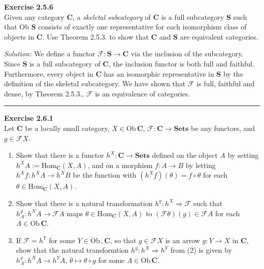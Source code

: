 \documentclass[a4paper, 11pt]{article}
\newenvironment{problem}[2][Exercise]
    { \begin{mdframed}[backgroundcolor=gray!20] \textbf{#1 #2} \\}
    {  \end{mdframed}}
\newenvironment{solution}
    {\textit{Solution:}}
    {}
\begin{document}
\begin{problem}{2.5.6}
Given any category \(\mathbf{C}\), a \textit{skeletal subcategory} of \(\mathbf{C}\) is a full subcategory \(\mathbf{S}\) such that Ob \(\mathbf{S}\) consists of 
exactly one representative for each isomorphism class of objects in \(\mathbf{C}\). Use Theorem 2.5.3. to show that \(\mathbf{C}\) and \(\mathbf{S}\) are equivalent categories.
\end{problem}
\begin{solution}
We define a functor \(\mathcal{F}:\mathbf{S}\rightarrow \mathbf{C}\) via the inclusion of the subcategory. Since \(\mathbf{S}\) is a full subcategory of \(\mathbf{C}\), the inclusion functor 
is both full and faithful. Furthermore, every object in \(\mathbf{C}\) has an isomorphic representative in \(\mathbf{S}\) by the definition of the skeletal subcategory. We have shown that 
\(\mathcal{F}\) is full, faithful and dense, by Theorem 2.5.3., \(\mathcal{F}\) is an equivalence of categories.
\end{solution}
\\ 
\noindent\rule{7in}{2.8pt}
\begin{problem}{2.6.1}
Let \(\mathbf{C}\) be a locally small category, \(X\in \text{Ob}\, \mathbf{C}\), \(\mathcal{F}:\mathbf{C}\rightarrow \textbf{Sets}\) be any functors, and \(g\in \mathcal{F}X\).
\begin{enumerate}
    \item Show that there is a functor \(h^X:\mathbf{C}\rightarrow \textbf{Sets}\) defined on the object \(A\) by setting \(h^X A:=\text{Hom}_{\mathbf{C}}(X,A)\), and on a morphism 
          \(f:A\rightarrow B\) by letting \(h^X f:h^X A\rightarrow h^X B\) be the function with \((h^X f)(\theta)=f\circ \theta\) for each \(\theta\in \text{Hom}_{\mathbf{C}}(X,A)\).
    \item Show that there is a natural transformation \(h^g:h^X\Rightarrow \mathcal{F}\) such that \(h^g_A: h^X A\rightarrow \mathcal{F}A\) maps \(\theta\in \text{Hom}_{\mathbf{C}}(X,A)\) 
          to \((\mathcal{F}\theta)(g)\in \mathcal{F}A\) for each \(A\in \text{Ob}\, \mathbf{C}\).
    \item If \(\mathcal{F}=h^Y\) for some \(Y\in \text{Ob}\, ,\mathbf{C}\), so that \(g\in \mathcal{F}X\) is an arrow \(g:Y\rightarrow X\) in \(\mathbf{C}\), show that the natural transformtion 
          \(h^g:h^X\Rightarrow h^Y\) from (2) is given by
          \(h^g_A:h^X A\rightarrow h^Y A\), \(\theta \mapsto \theta\circ g\) for some \(A\in \text{Ob}\, \mathbf{C}\). 
\end{enumerate}
\end{problem}
\end{document}
